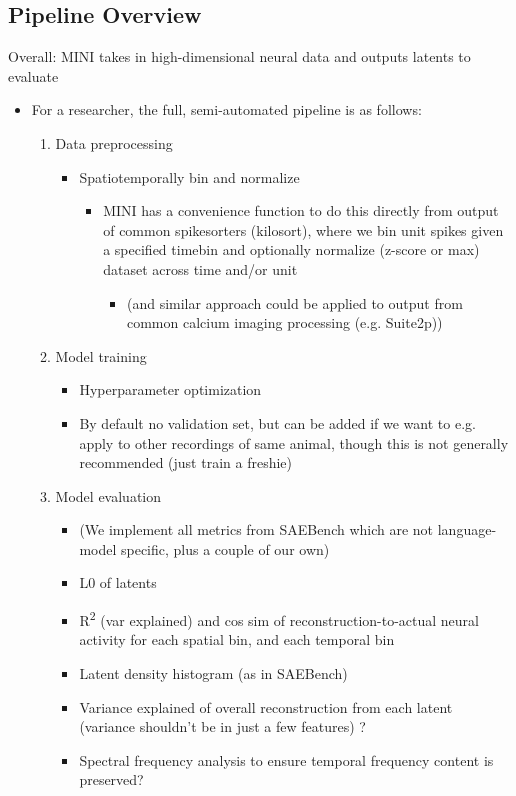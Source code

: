 \subsection{Pipeline Overview}

Overall: MINI takes in high-dimensional neural data and outputs latents to evaluate

\begin{itemize}
    \item For a researcher, the full, semi-automated pipeline is as follows:
    \begin{enumerate}
        \item Data preprocessing
        \begin{itemize}
            \item Spatiotemporally bin and normalize
            \begin{itemize}
                \item MINI has a convenience function to do this directly from output of common spikesorters (kilosort), where we bin unit spikes given a specified timebin and optionally normalize (z-score or max) dataset across time and/or unit
                \begin{itemize}
                    \item (and similar approach could be applied to output from common calcium imaging processing (e.g. Suite2p))
                \end{itemize}
            \end{itemize}
        \end{itemize}
        
        \item Model training
        \begin{itemize}
            \item Hyperparameter optimization
            \item By default no validation set, but can be added if we want to e.g. apply to other recordings of same animal, though this is not generally recommended (just train a freshie)
        \end{itemize}
        
        \item Model evaluation
        \begin{itemize}
            \item (We implement all metrics from SAEBench which are not language-model specific, plus a couple of our own)
            \item L0 of latents
            \item R\textsuperscript{2} (var explained) and cos sim of reconstruction-to-actual neural activity for each spatial bin, and each temporal bin
            \item Latent density histogram (as in SAEBench)
            \item Variance explained of overall reconstruction from each latent (variance shouldn't be in just a few features) ?
            \item Spectral frequency analysis to ensure temporal frequency content is preserved?
        \end{itemize}
        

\end{enumerate}
\end{itemize}
